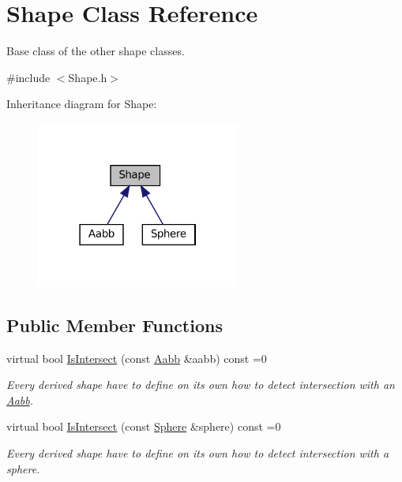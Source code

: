 \hypertarget{classShape}{}\section{Shape Class Reference}
\label{classShape}


Base class of the other shape classes.  




{\ttfamily \#include $<$Shape.\+h$>$}



Inheritance diagram for Shape\+:
\nopagebreak
\begin{figure}[H]
\begin{center}
\leavevmode
\includegraphics[width=190pt]{classShape__inherit__graph}
\end{center}
\end{figure}
\subsection*{Public Member Functions}
\begin{DoxyCompactItemize}
\item 
virtual bool \hyperlink{classShape_a1bfc3d6c995c4326d4691b22d16d2f12}{Is\+Intersect} (const \hyperlink{classAabb}{Aabb} \&aabb) const =0
\begin{DoxyCompactList}\small\item\em Every derived shape have to define on its own how to detect intersection with an \hyperlink{classAabb}{Aabb}. \end{DoxyCompactList}\item 
virtual bool \hyperlink{classShape_a1c942dca54e0d81f685624f33f2ce6c8}{Is\+Intersect} (const \hyperlink{classSphere}{Sphere} \&sphere) const =0
\begin{DoxyCompactList}\small\item\em Every derived shape have to define on its own how to detect intersection with a sphere. \end{DoxyCompactList}\end{DoxyCompactItemize}



